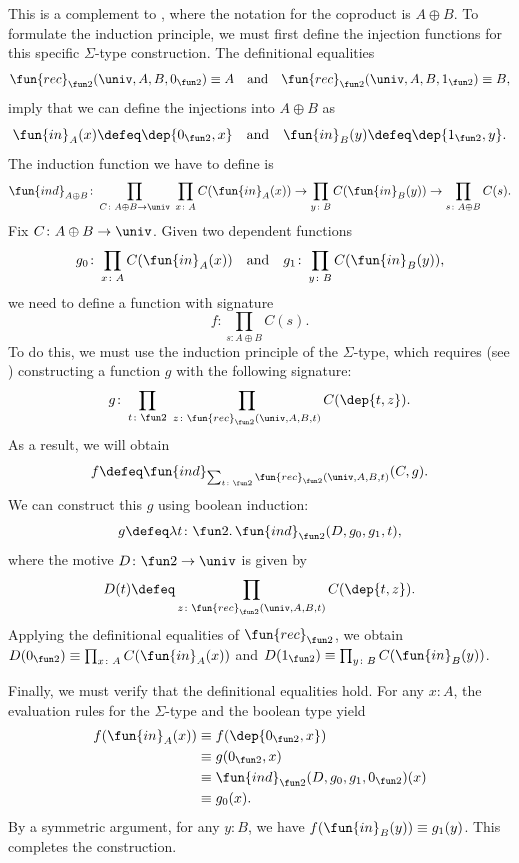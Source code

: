 \begin{solution}
    This is a complement to , where the notation for the coproduct is $A\oplus B$. To formulate the induction principle, we must first define the injection functions for this specific $\Sigma$-type construction. The definitional equalities
    \[
        \fun{rec}_{\fun2}(\univ,A,B,0_{\fun2})\equiv A
        \quad\text{and}\quad
        \fun{rec}_{\fun2}(\univ,A,B,1_{\fun2})\equiv B,
    \]
    imply that we can define the injections into $A\oplus B$ as
    \[
        \fun{in}_A(x)\defeq\dep{0_{\fun2},x}
        \quad\text{and}\quad
        \fun{in}_B(y)\defeq\dep{1_{\fun2},y}.
    \]
    The induction function we have to define is
    \[
        \fun{ind}_{A\oplus B}\colon\prod_{C\colon A\oplus B\to\univ}\;
            \prod_{x\colon A}C(\fun{in}_A(x))
            \to
            \prod_{y\colon B}C(\fun{in}_B(y))
            \to
            \prod_{s\colon A\oplus B}C(s).
    \]
    Fix $C\colon A\oplus B\to\univ$. Given two dependent functions
    \[
        g_0\colon\prod_{x\colon A}C(\fun{in}_A(x))
        \quad\text{and}\quad
        g_1\colon\prod_{y\colon B}C(\fun{in}_B(y)),
    \]
    we need to define a function with signature
    \[
        f\colon\prod_{s\colon A\oplus B} C(s).
    \]
    To do this, we must use the induction principle of the $\Sigma$-type, which requires (see ) constructing a function $g$ with the following signature:
    \[
        g\colon
            \prod_{t\colon\fun2\vphantom{\univ y}}\;
            \prod_{z\colon\fun{rec}_{\fun2}(\univ,A,B,t)}
            C(\dep{t,z}).
    \]
    As a result, we will obtain
    \[
        f \defeq\fun{ind}_{\sum_{t\colon\fun2}\fun{rec}_{\fun2}(\univ,A,B,t)}
            (C,g).
    \]
    We can construct this $g$ using boolean induction:
    \[
        g\defeq\lambda t\colon\fun2.\,\fun{ind}_{\fun2}(D,g_0,g_1,t),
    \]
    where the motive $D\colon\fun2\to\univ$ is given by
    \[
        D(t)\defeq\prod_{z\colon\fun{rec}_{\fun2}(\univ,A,B,t)}C(\dep{t,z}).
    \]
    Applying the definitional equalities of $\fun{rec}_{\fun2}$, we obtain $D(0_{\fun2})\equiv \prod_{x\colon A}C(\fun{in}_A(x))$ and $D(1_{\fun2})\equiv \prod_{y\colon B}C(\fun{in}_B(y))$.

    Finally, we must verify that the definitional equalities hold. For any $x\colon A$, the evaluation rules for the $\Sigma$-type and the boolean type yield
    \begin{align*}
        f(\fun{in}_A(x)) 
        &\equiv f(\dep{0_{\fun2}, x}) \\
        &\equiv g(0_{\fun2}, x) \\
        &\equiv \fun{ind}_{\fun2}(D,g_0,g_1,0_{\fun2})(x) \\
        &\equiv g_0(x).
    \end{align*}
    By a symmetric argument, for any $y\colon B$, we have $f(\fun{in}_B(y))\equiv g_1(y)$. This completes the construction.
\end{solution}

